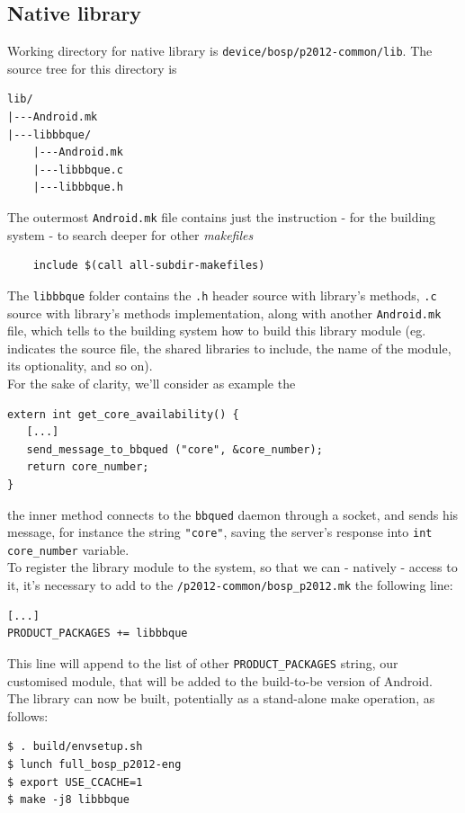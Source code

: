 \subsection{Native library}
Working directory for native library is \texttt{device/bosp/p2012-common/lib}.
The source tree for this directory is
\begin{verbatim}
lib/
|---Android.mk
|---libbbque/
    |---Android.mk
    |---libbbque.c
    |---libbbque.h
\end{verbatim}
The outermost \texttt{Android.mk} file contains just the instruction - for the building system - to search deeper for other \textit{makefiles}
\begin{verbatim}
	include $(call all-subdir-makefiles)
\end{verbatim}
The \texttt{libbbque} folder contains the \texttt{.h} header source with library's methods, \texttt{.c} source with library's methods implementation, along with another \texttt{Android.mk} file, which tells to the building system how to build this library module (eg. indicates the source file, the shared libraries to include, the name of the module, its optionality, and so on).\\
For the sake of clarity, we'll consider as example the
\begin{verbatim}
extern int get_core_availability() {
   [...]
   send_message_to_bbqued ("core", &core_number);
   return core_number;
}
\end{verbatim}
the inner method connects to the \texttt{bbqued} daemon through a socket, and sends his message, for instance the string \texttt{"core"}, saving the server's response into \texttt{int core\_number} variable.\\
To register the library module to the system, so that we can - natively - access to it, it's necessary to add to the \texttt{/p2012-common/bosp\_p2012.mk} the following line:
\begin{verbatim}
[...]
PRODUCT_PACKAGES += libbbque
\end{verbatim}
This line will append to the list of other \texttt{PRODUCT\_PACKAGES} string, our customised module, that will be added to the build-to-be version of Android.\\
The library can now be built, potentially as a stand-alone make operation, as follows:
\begin{verbatim}
$ . build/envsetup.sh
$ lunch full_bosp_p2012-eng
$ export USE_CCACHE=1
$ make -j8 libbbque
\end{verbatim}
